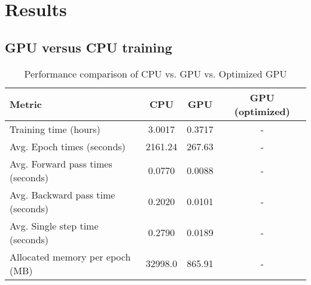 \section{Results}\label{sec:results}

\subsection{GPU versus CPU training}
\begin{table}[h]
    \centering
    \begin{tabular}{lccc}
        \toprule
        \textbf{Metric} & \textbf{CPU} & \textbf{GPU} & \textbf{GPU (optimized)} \\
        \midrule
        Training time (hours)       & 3.0017 & 0.3717 & - \\
        Avg. Epoch times (seconds)       & 2161.24 & 267.63 & - \\
        Avg. Forward pass times (seconds)& 0.0770 & 0.0088 & - \\
        Avg. Backward pass time (seconds)& 0.2020 & 0.0101 & - \\
        Avg. Single step time (seconds)  & 0.2790 & 0.0189 & - \\
        Allocated memory per epoch (MB)       & 32998.0  & 865.91 & - \\
        \bottomrule
    \end{tabular}
    \caption{Performance comparison of CPU vs. GPU vs. Optimized GPU}
\end{table}




